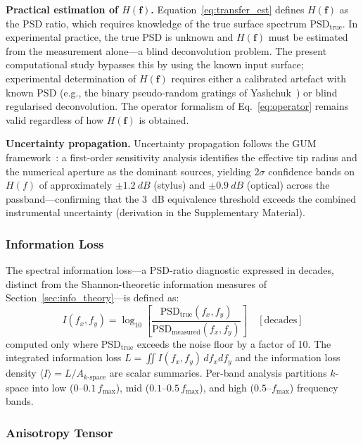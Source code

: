 \documentclass[review,12pt]{elsarticle}
\begin{document}
\textbf{Practical estimation of $H(\mathbf{f})$.} Equation~\ref{eq:transfer_est} defines $H(\mathbf{f})$ as the PSD ratio, which requires knowledge of the true surface spectrum $\mathrm{PSD}_\mathrm{true}$. In experimental practice, the true PSD is unknown and $H(\mathbf{f})$ must be estimated from the measurement alone---a blind deconvolution problem. The present computational study bypasses this by using the known input surface; experimental determination of $H(\mathbf{f})$ requires either a calibrated artefact with known PSD (e.g., the binary pseudo-random gratings of Yashchuk~\cite{yashchuk2015binary}) or blind regularised deconvolution. The operator formalism of Eq.~\ref{eq:operator} remains valid regardless of how $H(\mathbf{f})$ is obtained.

\textbf{Uncertainty propagation.} Uncertainty propagation follows the GUM framework~\cite{jcgm2008gum}: a first-order sensitivity analysis identifies the effective tip radius and the numerical aperture as the dominant sources, yielding $2\sigma$ confidence bands on $H(f)$ of approximately $\pm\SI{1.2}{dB}$ (stylus) and $\pm\SI{0.9}{dB}$ (optical) across the passband---confirming that the \SI{3}{dB} equivalence threshold exceeds the combined instrumental uncertainty (derivation in the Supplementary Material).

\subsubsection{Information Loss}

The spectral information loss---a PSD-ratio diagnostic expressed in decades, distinct from the Shannon-theoretic information measures of Section~\ref{sec:info_theory}---is defined as:
\begin{equation}
    I(f_x,f_y) = \log_{10}\!\left[\frac{\mathrm{PSD}_\mathrm{true}(f_x,f_y)}{\mathrm{PSD}_\mathrm{measured}(f_x,f_y)}\right] \quad [\text{decades}]
    \label{eq:info_loss}
\end{equation}
computed only where $\mathrm{PSD}_\mathrm{true}$ exceeds the noise floor by a factor of 10. The integrated information loss $ L = \iint I(f_x,f_y)\,df_x df_y$ and the information loss density $\langle I \rangle = L / A_{k\text{-space}}$ are scalar summaries. Per-band analysis partitions $ k$-space into low ($0$--$0.1\,f_\mathrm{max}$), mid ($0.1$--$0.5\,f_\mathrm{max}$), and high ($0.5$--$f_\mathrm{max}$) frequency bands.

\subsubsection{Anisotropy Tensor}
\end{document}
